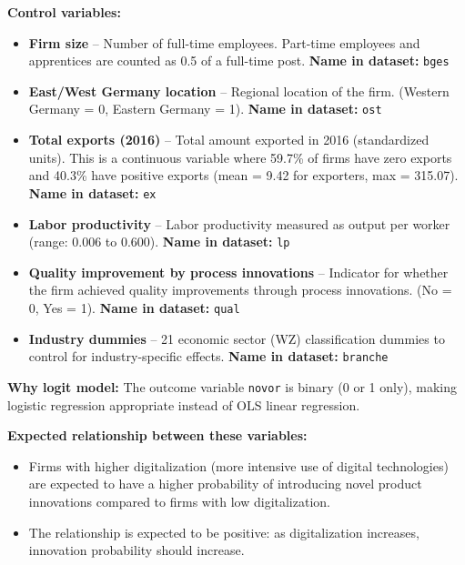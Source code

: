 \documentclass[a4paper,12pt]{article}
\begin{document}
\textbf{Control variables:}
\begin{itemize}
    \item \textbf{Firm size} -- Number of full-time employees. Part-time employees and apprentices are counted as 0.5 of a full-time post. \textbf{Name in dataset:} \texttt{bges}
    
    \item \textbf{East/West Germany location} -- Regional location of the firm. (Western Germany = 0, Eastern Germany = 1). \textbf{Name in dataset:} \texttt{ost}
    
    \item \textbf{Total exports (2016)} -- Total amount exported in 2016 (standardized units). This is a continuous variable where 59.7\% of firms have zero exports and 40.3\% have positive exports (mean = 9.42 for exporters, max = 315.07). \textbf{Name in dataset:} \texttt{ex}
    
    \item \textbf{Labor productivity} -- Labor productivity measured as output per worker (range: 0.006 to 0.600). \textbf{Name in dataset:} \texttt{lp}
    
    \item \textbf{Quality improvement by process innovations} -- Indicator for whether the firm achieved quality improvements through process innovations. (No = 0, Yes = 1). \textbf{Name in dataset:} \texttt{qual}
    
    \item \textbf{Industry dummies} -- 21 economic sector (WZ) classification dummies to control for industry-specific effects. \textbf{Name in dataset:} \texttt{branche}
\end{itemize}

\textbf{Why logit model:} The outcome variable \texttt{novor} is binary (0 or 1 only), making logistic regression appropriate instead of OLS linear regression.

\textbf{Expected relationship between these variables:}
\begin{itemize}
    \item Firms with higher digitalization (more intensive use of digital technologies) are expected to have a higher probability of introducing novel product innovations compared to firms with low digitalization.
    \item The relationship is expected to be positive: as digitalization increases, innovation probability should increase.
\end{itemize}
\end{document}
